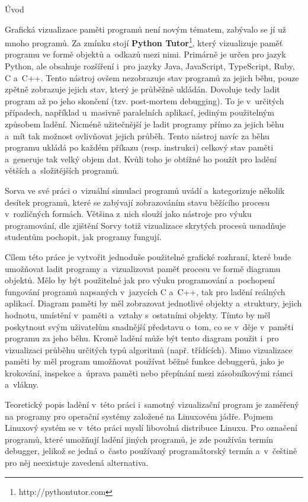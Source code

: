 \documentclass[czech,bachelor,male,python,dept460,hidelinks]{diploma}						%
\newcommand{\parspace}[1][]{
	\ifthenelse{\isempty{#1}}{\vspace{0mm}}{\vspace{#1}}
	\par
}
\begin{document}
\begin{section}{Úvod}
	\parspace Grafická vizualizace paměti programů není novým tématem, zabývalo se jí už mnoho programů. Za zmínku stojí
	\textbf{Python Tutor}\footnote{http://pythontutor.com}, který vizualizuje paměť programu ve formě objektů a~odkazů mezi nimi. \cite{GuoSIGCSE2013}
	Primárně je určen pro jazyk Python, ale obsahuje rozšíření i~pro jazyky Java, JavaScript, TypeScript, Ruby, C a~C++.
	Tento nástroj ovšem nezobrazuje stav programů za jejich běhu, pouze zpětně zobrazuje jejich stav, který je průběžně ukládán.
	Dovoluje tedy ladit program až po jeho skončení (tzv. post-mortem debugging). To je v~určitých případech, například u~masivně
	paralelních aplikací, jediným použitelným způsobem ladění. Nicméně užitečnější je ladit programy přímo za jejich běhu a~mít
	tak možnost ovlivňovat jejich průběh. Tento nástroj navíc za běhu programu ukládá po každém příkazu (resp. instrukci) celkový stav paměti
	a~generuje tak velký objem dat. Kvůli toho je obtížné ho použít pro ladění větších a~složitějších programů.
	
	\parspace Sorva \cite[140]{sorva2012visual} ve své práci o~vizuální simulaci programů uvádí a~kategorizuje několik desítek programů,
	které se zabývají zobrazováním stavu běžícího procesu v~rozličných formách. Většina z~nich slouží jako nástroje pro výuku programování,
	dle zjištění Sorvy totiž vizualizace skrytých procesů usnadňuje studentům pochopit, jak programy fungují. \cite[212]{sorva2012visual}
	
	\parspace Cílem této práce je vytvořit jednoduše použitelné grafické rozhraní, které bude umožňovat ladit programy a~vizualizovat paměť procesu
	ve formě diagramu objektů. Mělo by být použitelné jak pro výuku programování a~pochopení fungování programů napsaných v~jazycích C a~C++, tak pro ladění
	reálných aplikací. Diagram paměti by měl zobrazovat jednotlivé objekty a~struktury, jejich hodnotu, umístění v~paměti a~vztahy s~ostatními objekty.
	Tímto by měl poskytnout svým uživatelům snadnější představu o~tom, co se v~děje v~paměti programu za jeho běhu.
	Kromě ladění může být tento diagram použit i~pro vizualizaci průběhu určitých typů algoritmů (např. třídících). Mimo vizualizace paměti by měl program
	umožňovat používat běžné funkce debuggerů, jako je krokování, inspekce a~úprava paměti nebo přepínání mezi zásobníkovými rámci a~vlákny.
	
	\parspace Teoretický popis ladění v~této práci i~samotný vizualizační program je zaměřený na programy pro operační systémy založené na Linuxovém jádře.
	Pojmem Linuxový systém se v~této práci myslí libovolná distribuce Linuxu. Pro označení programů, které umožňují ladění jiných programů,
	je zde používán termín debugger, jelikož se jedná o~často používaný programátorský termín a~v~češtině pro něj neexistuje zavedená alternativa.


\end{section}
\end{document}

